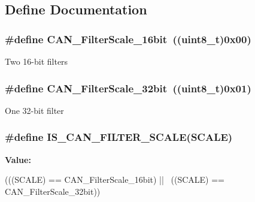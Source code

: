 \subsection{Define Documentation}
\hypertarget{group__CAN__filter__scale_ga9e0493937e73bcf9a4127eef2f255a95}{
\subsubsection[{CAN\_\-FilterScale\_\-16bit}]{\setlength{\rightskip}{0pt plus 5cm}\#define CAN\_\-FilterScale\_\-16bit~((uint8\_\-t)0x00)}}
\label{group__CAN__filter__scale_ga9e0493937e73bcf9a4127eef2f255a95}
Two 16-\/bit filters \hypertarget{group__CAN__filter__scale_gac63dfb0e11713c59268ee9f4aebab60e}{
\subsubsection[{CAN\_\-FilterScale\_\-32bit}]{\setlength{\rightskip}{0pt plus 5cm}\#define CAN\_\-FilterScale\_\-32bit~((uint8\_\-t)0x01)}}
\label{group__CAN__filter__scale_gac63dfb0e11713c59268ee9f4aebab60e}
One 32-\/bit filter \hypertarget{group__CAN__filter__scale_gaf64c93166af0eb5ec7e804116f10783a}{
\subsubsection[{IS\_\-CAN\_\-FILTER\_\-SCALE}]{\setlength{\rightskip}{0pt plus 5cm}\#define IS\_\-CAN\_\-FILTER\_\-SCALE(SCALE)}}
\label{group__CAN__filter__scale_gaf64c93166af0eb5ec7e804116f10783a}
{\bfseries Value:}
\begin{DoxyCode}
(((SCALE) == CAN_FilterScale_16bit) || \
                                    ((SCALE) == CAN_FilterScale_32bit))
\end{DoxyCode}
